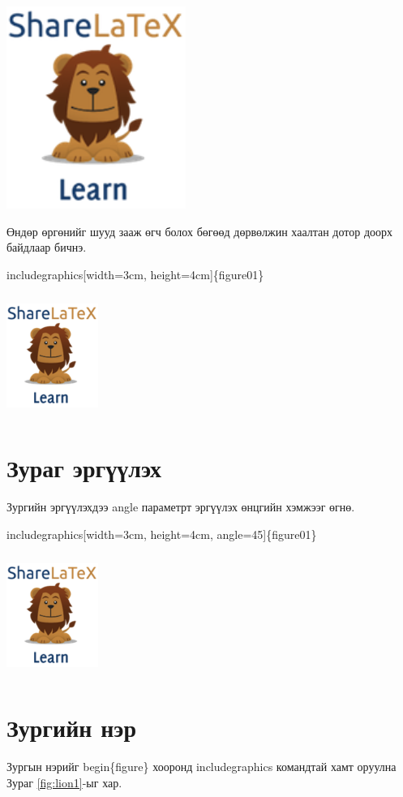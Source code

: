 \documentclass[12pt,A4]{report}
\begin{document}
\includegraphics[scale=0.9]{figure01}

Өндөр өргөнийг шууд зааж өгч болох бөгөөд дөрвөлжин хаалтан дотор доорх байдлаар бичнэ.
\begin{center}
	includegraphics[width=3cm, height=4cm]\{figure01\}
\end{center}
\includegraphics[width=3cm, height=4cm]{figure01}

\section{Зураг эргүүлэх}
Зургийн эргүүлэхдээ angle параметрт эргүүлэх өнцгийн хэмжээг өгнө.
\begin{center}
	includegraphics[width=3cm, height=4cm, angle=45]\{figure01\}
\end{center}
\includegraphics[width=3cm, height=4cm, angle=45]{figure01}

\section{Зургийн нэр}
Зургын нэрийг begin\{figure\} хооронд includegraphics командтай хамт оруулна Зураг \ref{fig:lion1}-ыг хар.
\end{document}
